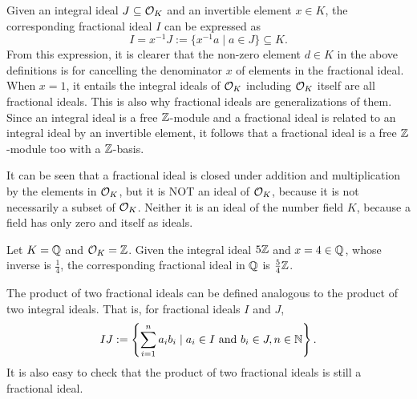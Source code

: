 \documentclass[../main.tex]{subfiles}
\begin{document}
Given an integral ideal $J \subseteq \mathcal{O}_K$ and an invertible element $x \in K$, the corresponding fractional ideal $I$ can be expressed as 
\begin{equation*}
I = x^{-1} J := \{x^{-1} a \mid a \in J\} \subseteq K.
\end{equation*}
From this expression, it is clearer that the non-zero element $d \in K$ in the above definitions is for cancelling the denominator $x$ of elements in the fractional ideal. When $x=1$, it entails the integral ideals of $\mathcal{O}_K$ including $\mathcal{O}_K$ itself are all fractional ideals. This is also why fractional ideals are generalizations of them.  
Since an integral ideal is a free $\mathbb{Z}$-module and a fractional ideal is related to an integral ideal by an invertible element, it follows that a fractional ideal is a free $\mathbb{Z}$-module too with a $\mathbb{Z}$-basis.   

It can be seen that a fractional ideal is closed under addition and multiplication by the elements in $\mathcal{O}_K$, but it is NOT an ideal of $\mathcal{O}_K$, because it is not necessarily a subset of $\mathcal{O}_K$. Neither it is an ideal of the number field $K$, because a field has only zero and itself as ideals. %

\begin{example}
Let $K= \mathbb{Q}$ and $\mathcal{O}_K= \mathbb{Z}$. Given the integral ideal $5\mathbb{Z}$ and $x=4 \in \mathbb{Q}$, whose inverse is $\frac{1}{4}$, the corresponding fractional ideal in $\mathbb{Q}$ is $\frac{5}{4}\mathbb{Z}$. 
\end{example}


The product of two fractional ideals can be defined analogous to the product of two 
\reversemarginpar
{}
integral ideals. That is, for fractional ideals $I$ and $J$, 
\begin{align*}
    IJ := \left\{\sum_{i=1}^n a_i b_i \mid a_i \in I \text{ and } b_i \in J, n \in \mathbb{N} \right\}.
\end{align*}
It is also easy to check that the product of two fractional ideals is still a fractional ideal. 
\end{document}
